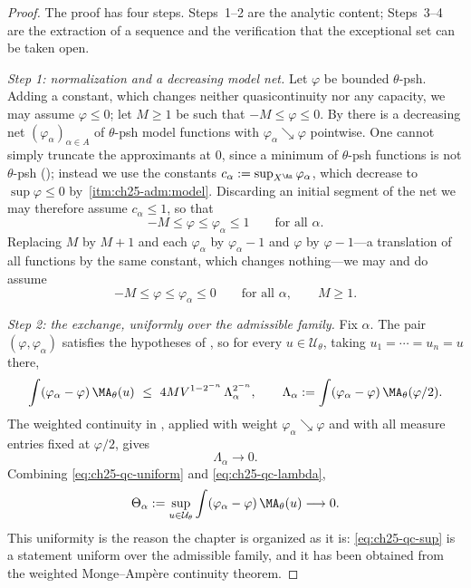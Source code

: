\begin{proof}
The proof has four steps.  Steps~1--2 are the analytic content; Steps~3--4
are the extraction of a sequence and the verification that the exceptional
set can be taken open.

\emph{Step 1: normalization and a decreasing model net.}  Let $\varphi$ be
bounded $\theta$-psh.  Adding a constant, which changes neither
quasicontinuity nor any capacity, we may assume $\varphi\leq0$; let
$M\geq1$ be such that $-M\leq\varphi\leq0$.  By
 there is a decreasing net
$(\varphi_\alpha)_{\alpha\in A}$ of $\theta$-psh model functions with
$\varphi_\alpha\searrow\varphi$ pointwise.  One cannot simply truncate the
approximants at $0$, since a minimum of $\theta$-psh functions is not
$\theta$-psh (); instead we use the constants
$c_\alpha:=\sup_{X^{\An}}\varphi_\alpha$, which decrease to
$\sup\varphi\leq0$ by
\,\cref{itm:ch25-adm:model}.  Discarding an
initial segment of the net we may therefore assume $c_\alpha\leq1$, so that
\begin{equation}
\label{eq:ch25-qc-normalization}
 -M\leq\varphi\leq\varphi_\alpha\leq1
 \qquad\text{for all }\alpha .
\end{equation}
Replacing $M$ by $M+1$ and each $\varphi_\alpha$ by
$\varphi_\alpha-1$ and $\varphi$ by $\varphi-1$---a translation of all
functions by the same constant, which changes nothing---we may and do assume
\begin{equation}
\label{eq:ch25-qc-normalization-two}
 -M\leq\varphi\leq\varphi_\alpha\leq0
 \qquad\text{for all }\alpha ,\qquad M\geq1 .
\end{equation}

\emph{Step 2: the exchange, uniformly over the admissible family.}  Fix
$\alpha$.  The pair $(\varphi,\varphi_\alpha)$ satisfies the hypotheses
of , so for every
$u\in\mathcal U_\theta$, taking $u_1=\cdots=u_n=u$ there,
\begin{equation}
\label{eq:ch25-qc-uniform}
 \int(\varphi_\alpha-\varphi)\,\MA_\theta(u)
 \ \leq\ 4MV^{1-2^{-n}}\,\Lambda_\alpha^{2^{-n}},
 \qquad
 \Lambda_\alpha:=\int(\varphi_\alpha-\varphi)\,
   \MA_\theta(\varphi/2).
\end{equation}
The weighted continuity in , applied with
weight $\varphi_\alpha\searrow\varphi$ and with all measure entries fixed at
$\varphi/2$, gives
\begin{equation}
\label{eq:ch25-qc-lambda}
 \Lambda_\alpha\longrightarrow0 .
\end{equation}
Combining \eqref{eq:ch25-qc-uniform} and \eqref{eq:ch25-qc-lambda},
\begin{equation}
\label{eq:ch25-qc-sup}
 \Theta_\alpha:=\sup_{u\in\mathcal U_\theta}
 \int(\varphi_\alpha-\varphi)\,\MA_\theta(u)\longrightarrow0 .
\end{equation}
This uniformity is the reason the chapter is organized as it is:
\eqref{eq:ch25-qc-sup} is a statement uniform over the admissible family, and
it has been obtained from the weighted Monge--Amp\`ere continuity theorem.


\end{proof}
